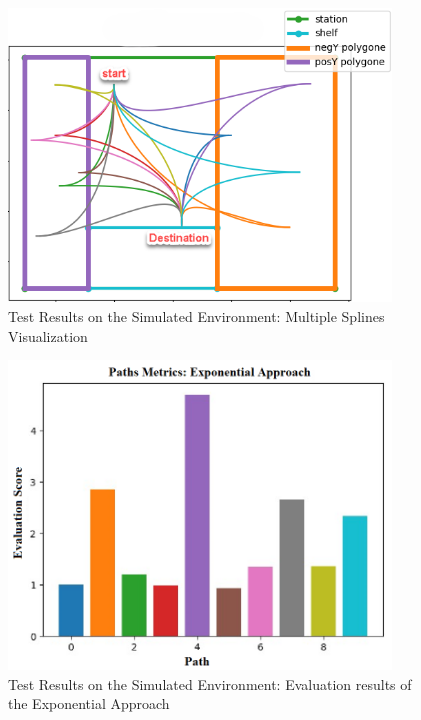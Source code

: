 \begin{figure}[H]
    \begin{center}
        \includegraphics[width=4in]{images/Chap2/Mult_Splines_noted.png} %
        \caption{Test Results on the Simulated Environment: Multiple Splines Visualization}
        \label{Mult_splines}
        \end{center}    
\end{figure}

\begin{figure}[H]
    \begin{center}
        \includegraphics[width=4in]{images/Chap2/Exp_Results.png} %
        \caption{Test Results on the Simulated Environment: Evaluation results of the Exponential Approach}
        \label{Test_Eval_Exp}
        \end{center}    
\end{figure}

